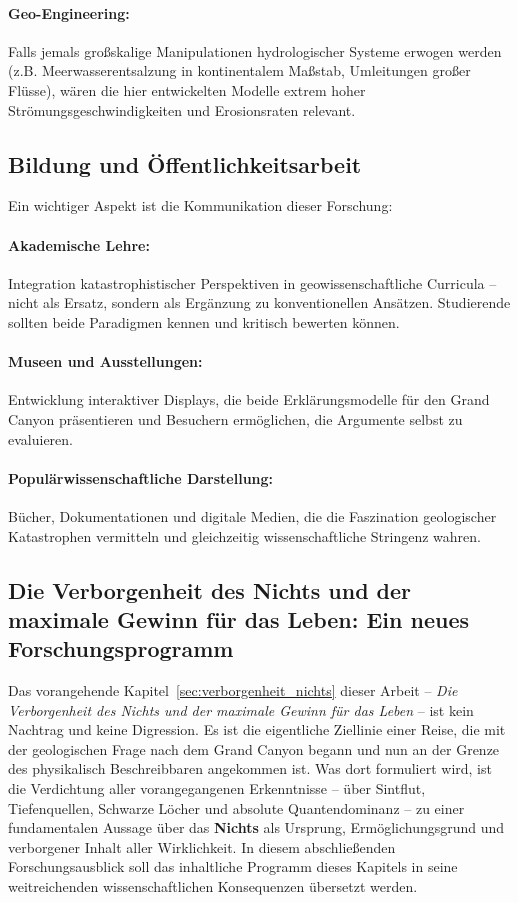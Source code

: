﻿\documentclass[12pt,a4paper]{report}
\begin{document}
\paragraph{Geo-Engineering:}
Falls jemals großskalige Manipulationen hydrologischer Systeme erwogen werden (z.B. Meerwasserentsalzung in kontinentalem Maßstab, Umleitungen großer Flüsse), wären die hier entwickelten Modelle extrem hoher Strömungsgeschwindigkeiten und Erosionsraten relevant.

\subsection{Bildung und Öffentlichkeitsarbeit}

Ein wichtiger Aspekt ist die Kommunikation dieser Forschung:

\paragraph{Akademische Lehre:}
Integration katastrophistischer Perspektiven in geowissenschaftliche Curricula -- nicht als Ersatz, sondern als Ergänzung zu konventionellen Ansätzen. Studierende sollten beide Paradigmen kennen und kritisch bewerten können.

\paragraph{Museen und Ausstellungen:}
Entwicklung interaktiver Displays, die beide Erklärungs\-modelle für den Grand Canyon präsentieren und Besuchern ermöglichen, die Argumente selbst zu evaluieren.

\paragraph{Populärwissenschaftliche Darstellung:}
Bücher, Dokumentationen und digitale Medien, die die Faszination geologischer Katastrophen vermitteln und gleichzeitig wissenschaftliche Stringenz wahren.

\subsection{Die Verborgenheit des Nichts und der maximale Gewinn für das Leben: Ein neues Forschungsprogramm}
\label{sec:ausblick_nichts_programm}

Das vorangehende Kapitel~\ref{sec:verborgenheit_nichts} dieser Arbeit -- \textit{Die Verborgenheit des Nichts und der maximale Gewinn für das Leben} -- ist kein Nachtrag und keine Digression. Es ist die eigentliche Ziellinie einer Reise, die mit der geologischen Frage nach dem Grand Canyon begann und nun an der Grenze des physikalisch Beschreibbaren angekommen ist. Was dort formuliert wird, ist die Verdichtung aller vorangegangenen Erkenntnisse -- über Sintflut, Tiefenquellen, Schwarze Löcher und absolute Quantendominanz -- zu einer fundamentalen Aussage über das \textbf{Nichts} als Ursprung, Ermöglichungsgrund und verborgener Inhalt aller Wirklichkeit. In diesem abschließenden Forschungsausblick soll das inhaltliche Programm dieses Kapitels in seine weitreichenden wissenschaftlichen Konsequenzen übersetzt werden.
\end{document}
